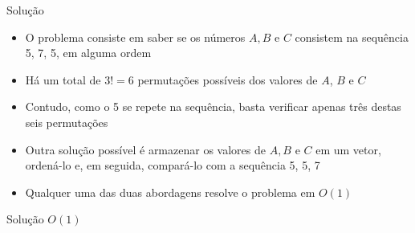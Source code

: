 \begin{frame}[fragile]{Solução}

    \begin{itemize}
        \item O problema consiste em saber se os números $A, B$ e $C$ consistem na sequência
            5, 7, 5, em alguma ordem

        \item Há um total de $3! = 6$ permutações possíveis dos valores de $A$, $B$ e $C$

        \item Contudo, como o 5 se repete na sequência, basta verificar apenas três destas
            seis permutações

        \item Outra solução possível é armazenar os valores de $A, B$ e $C$ em um vetor, ordená-lo
            e, em seguida, compará-lo com a sequência 5, 5, 7

        \item Qualquer uma das duas abordagens resolve o problema em $O(1)$
    \end{itemize}

\end{frame}

\begin{frame}[fragile]{Solução $O(1)$}
\end{frame}
